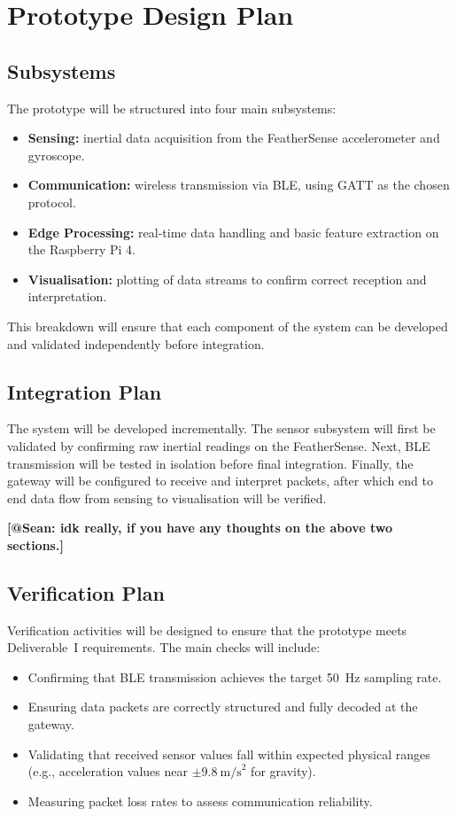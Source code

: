 \documentclass[conference]{IEEEtran}
\begin{document}
\section{Prototype Design Plan}

\subsection{Subsystems}
The prototype will be structured into four main subsystems: 
\begin{itemize}
	\item \textbf{Sensing:} inertial data acquisition from the FeatherSense accelerometer and gyroscope. 
	\item \textbf{Communication:} wireless transmission via BLE, using GATT as the chosen protocol. 
	\item \textbf{Edge Processing:} real-time data handling and basic feature extraction on the Raspberry Pi 4. 
	\item \textbf{Visualisation:} plotting of data streams to confirm correct reception and interpretation. 
\end{itemize}
This breakdown will ensure that each component of the system can be developed and validated independently before integration. 

\subsection{Integration Plan}
The system will be developed incrementally. The sensor subsystem will first be validated by confirming raw inertial readings on the FeatherSense. Next, BLE transmission will be tested in isolation before final integration. Finally, the gateway will be configured to receive and interpret packets, after which end to end data flow from sensing to visualisation will be verified. 


\textbf{[@Sean: idk really, if you have any thoughts on the above two sections.]}

\subsection{Verification Plan}
Verification activities will be designed to ensure that the prototype meets Deliverable~I requirements. The main checks will include:
\begin{itemize}
	\item Confirming that BLE transmission achieves the target 50~Hz sampling rate. 
	\item Ensuring data packets are correctly structured and fully decoded at the gateway. 
	\item Validating that received sensor values fall within expected physical ranges (e.g., acceleration values near $\pm 9.8~\text{m/s}^2$ for gravity). 
	\item Measuring packet loss rates to assess communication reliability. 
\end{itemize}
\end{document}
